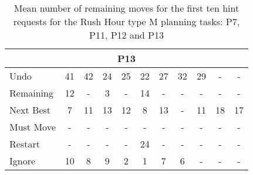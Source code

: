 \begin{table}[tpb]
{\begin{tabular}{|l|cccccccccc|}
\multicolumn{11}{|c|}{P13} \\ \hline
Undo & 41 & 42 & 24 & 25 & 22 & 27 & 32 & 29 & - & - \\ \cline{1-1}
Remaining & 12 & - & 3 & - & 14 & - & - & - & - & - \\ \cline{1-1}
Next Best & 7 & 11 & 13 & 12 & 8 & 13 & - & 11 & 18 & 17 \\ \cline{1-1}
Must Move & - & - & - & - & - & - & - & - & - & - \\ \cline{1-1}
Restart & - & - & - & - & 24 & - & - & - & - & - \\ \cline{1-1}
Ignore & 10 & 8 & 9 & 2 & 1 & 7 & 6 & - & - & - \\ \hline
\end{tabular}%
}
\caption{Mean number of remaining moves for the first ten hint requests for the Rush Hour type M planning tasks: P7, P11, P12 and P13}
\label{tab:requesttypem}
\end{table}


\begin{table}[tpb]
\centering
{}
\caption{Latest time the landmarks are achieved in number of moves for the solutions produced by an automated planner and the human subjects who solved the planning task P1}
\label{tab:p1landmarkachievement}
\end{table}

